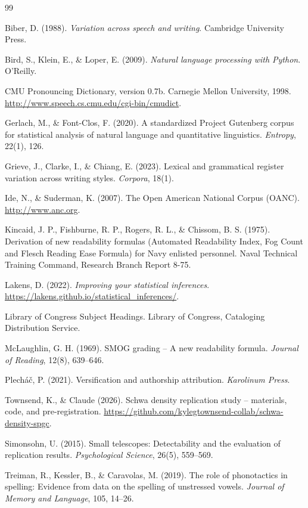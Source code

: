 \documentclass[11pt,a4paper]{article}
\begin{document}
\begin{thebibliography}{99}

Biber, D. (1988). \textit{Variation across speech and writing}.
Cambridge University Press.

Bird, S., Klein, E., \& Loper, E. (2009). \textit{Natural language
processing with Python}. O'Reilly.

CMU Pronouncing Dictionary, version 0.7b. Carnegie Mellon University,
1998. \url{http://www.speech.cs.cmu.edu/cgi-bin/cmudict}.

Gerlach, M., \& Font-Clos, F. (2020). A standardized Project Gutenberg
corpus for statistical analysis of natural language and quantitative
linguistics. \textit{Entropy}, 22(1), 126.

Grieve, J., Clarke, I., \& Chiang, E. (2023). Lexical and grammatical
register variation across writing styles. \textit{Corpora}, 18(1).

Ide, N., \& Suderman, K. (2007). The Open American National Corpus
(OANC). \url{http://www.anc.org}.

Kincaid, J. P., Fishburne, R. P., Rogers, R. L., \& Chissom, B. S.
(1975). Derivation of new readability formulas (Automated Readability
Index, Fog Count and Flesch Reading Ease Formula) for Navy enlisted
personnel. Naval Technical Training Command, Research Branch
Report 8-75.

Lakens, D. (2022). \textit{Improving your statistical inferences}.
\url{https://lakens.github.io/statistical_inferences/}.

Library of Congress Subject Headings. Library of Congress, Cataloging
Distribution Service.

McLaughlin, G. H. (1969). SMOG grading -- A new readability formula.
\textit{Journal of Reading}, 12(8), 639--646.

Plech\'{a}\v{c}, P. (2021). Versification and authorship attribution.
\textit{Karolinum Press}.

Townsend, K., \& Claude (2026). Schwa density replication study --
materials, code, and pre-registration.
\url{https://github.com/kylegtownsend-collab/schwa-density-spgc}.

Simonsohn, U. (2015). Small telescopes: Detectability and the
evaluation of replication results. \textit{Psychological Science},
26(5), 559--569.

Treiman, R., Kessler, B., \& Caravolas, M. (2019). The role of
phonotactics in spelling: Evidence from data on the spelling of
unstressed vowels. \textit{Journal of Memory and Language}, 105, 14--26.

\end{thebibliography}
\end{document}
